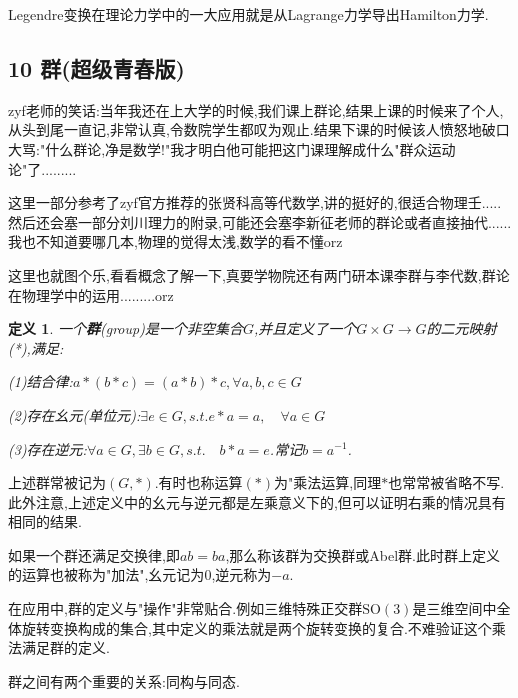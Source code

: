\documentclass[UTF8]{article}
\begin{document}
	Legendre变换在理论力学中的一大应用就是从Lagrange力学导出Hamilton力学.
	
	\newpage
	
	
	
	
	
\subsection*{10 群(超级青春版)}
	
	zyf老师的笑话:当年我还在上大学的时候,我们课上群论,结果上课的时候来了个人,从头到尾一直记,非常认真,令数院学生都叹为观止.结果下课的时候该人愤怒地破口大骂:"什么群论,净是数学!"我才明白他可能把这门课理解成什么"群众运动论"了.........

	这里一部分参考了zyf官方推荐的张贤科高等代数学\cite{ZhangXianKe},讲的挺好的,很适合物理壬.....然后还会塞一部分刘川理力\cite{LiuChuan}的附录,可能还会塞李新征老师的群论或者直接抽代......我也不知道要哪几本,物理的觉得太浅,数学的看不懂orz
	
	这里也就图个乐,看看概念了解一下,真要学物院还有两门研本课李群与李代数,群论在物理学中的运用.........orz
	
	\newtheorem*{Group}{定义}
	
	\begin{Group}
		
		一个\textbf{群}(group)是一个非空集合$G$,并且定义了一个$G \times G \to G$的二元映射(*),满足:
		
		(1)结合律:$a * (b * c) = (a * b) * c, \forall a,b,c \in G$
		
		(2)存在幺元(单位元):$\exists e \in G, s.t. e * a = a, \quad \forall a \in G$
		
		(3)存在逆元:$\forall a \in G, \exists b \in G, s.t. \quad b * a = e$.常记$b = a^{-1}$.
		
	\end{Group}
	
	上述群常被记为$(G , *)$.有时也称运算$(*)$为"乘法运算,同理$*$也常常被省略不写.此外注意,上述定义中的幺元与逆元都是左乘意义下的,但可以证明右乘的情况具有相同的结果.
	
	如果一个群还满足交换律,即$ab=ba$,那么称该群为交换群或Abel群.此时群上定义的运算也被称为"加法",幺元记为$0$,逆元称为$-a$.
	
	在应用中,群的定义与"操作"非常贴合.例如三维特殊正交群$\mathrm{SO(3)}$是三维空间中全体旋转变换构成的集合,其中定义的乘法就是两个旋转变换的复合.不难验证这个乘法满足群的定义.
	
	群之间有两个重要的关系:同构与同态.
	
	\newtheorem*{homomorphism}{定义}
	
\end{document}
